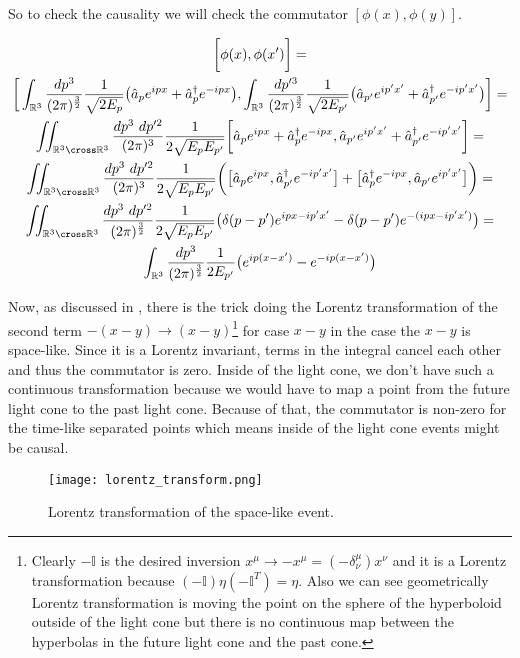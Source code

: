 So to check the causality we will check the commutator $[\phi(x), \phi(y)]$.

\begin{equation*}
    \begin{gathered}
        \bigg[\phi(x), \phi(x')\bigg] = \\
        \bigg[
            \int_{\mathbb{R}^{3}} \frac{dp^{3}}{(2 \pi)^{\frac{3}{2}}} \frac{1}{\sqrt{2 E_{p}}} \big(\hat{a}_{p} e^{ipx} + \hat{a}^{\dagger}_{p} e^{-ipx}\big),
            \int_{\mathbb{R}^{3}} \frac{dp'^{3}}{(2 \pi)^{\frac{3}{2}}} \frac{1}{\sqrt{2 E_{p'}}} \big(\hat{a}_{p'} e^{ip'x'} + \hat{a}^{\dagger}_{p'} e^{-ip'x'}\big)
        \bigg] = \\
        \iint_{\mathbb{R}^{3} \cross \mathbb{R}^{3}} \frac{dp^{3} \ dp'^{2}}{(2 \pi)^{3}} \frac{1}{2 \sqrt{E_{p} E_{p'}}}
        \bigg[
            \hat{a}_{p} e^{ipx} + \hat{a}^{\dagger}_{p} e^{-ipx},
            \hat{a}_{p'} e^{ip'x'} + \hat{a}^{\dagger}_{p'} e^{-ip'x'}
        \bigg] = \\
        \iint_{\mathbb{R}^{3} \cross \mathbb{R}^{3}} \frac{dp^{3} \ dp'^{2}}{(2 \pi)^{3}} \frac{1}{2 \sqrt{E_{p} E_{p'}}}
        \bigg(
            \big[\hat{a}_{p} e^{ipx}, \hat{a}^{\dagger}_{p'} e^{-ip'x'}\big] + \big[\hat{a}^{\dagger}_{p} e^{-ipx}, \hat{a}_{p'} e^{ip'x'}\big]
        \bigg) = \\
        \iint_{\mathbb{R}^{3} \cross \mathbb{R}^{3}} \frac{dp^{3} \ dp'^{2}}{(2 \pi)^{\frac{3}{2}}} \frac{1}{2 \sqrt{E_{p} E_{p'}}}
        \big(\delta(p - p') e^{ipx - ip'x'} - \delta(p - p') e^{-(ipx - ip'x')} \big) = \\
        \int_{\mathbb{R}^{3}} \frac{dp^{3}}{(2 \pi)^{\frac{3}{2}}} \frac{1}{2 E_{p'}} \big(e^{ip(x - x')} - e^{-ip(x - x')} \big)
    \end{gathered}
\end{equation*}

Now, as discussed in \cite{peskin_schroeder}, there is the trick doing the Lorentz transformation of the second term $-(x - y) \to (x - y)$\footnote{Clearly $-\mathbb{I}$ 
is the desired inversion $x^{\mu} \to -x^{\mu} = (-\delta^{\mu}_{\nu}) x^{\nu}$ and it is a Lorentz transformation because $(-\mathbb{I}) \eta 
(-\mathbb{I}^{T}) = \eta$. Also we can see geometrically Lorentz transformation is moving the point on the sphere of the hyperboloid outside of the
light cone but there is no continuous map between the hyperbolas in the future light cone and the past cone.} for case $x -  y$ in the case the $x - y$ is space-like. Since it
is a Lorentz invariant, terms in the integral cancel each other and thus the commutator is zero. Inside of the light cone, we don't have such a continuous transformation
because we would have to map a point from the future light cone to the past light cone. Because of that, the commutator is non-zero for the time-like separated points which means 
inside of the light cone events might be causal.

\begin{figure}[H]
    \centering
    \texttt{[image: lorentz\_transform.png]}
    \caption{Lorentz transformation of the space-like event.}
    \label{fig:lorentz_transform}
\end{figure}

